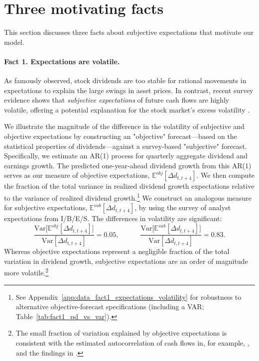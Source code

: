 \section{Three motivating facts}
\label{sec:facts.sec}

This section discusses three facts about subjective expectations that motivate our model. 

\paragraph{Fact 1. Expectations are volatile.}
As \citet{shiller1981stock} famously observed, stock dividends are too stable for rational movements in expectations to explain the large swings in asset prices. In contrast, recent survey evidence shows that \textit{subjective expectations} of future cash flows are highly volatile, offering a potential explanation for the stock market's excess volatility \citep{bordalo2020expectations, de_la_o_subjective_2021}.

We illustrate the magnitude of the difference in the volatility of subjective and objective expectations by constructing an "objective" forecast---based on the statistical properties of dividends---against a survey-based "subjective" forecast. Specifically, we estimate an AR(1) process for quarterly aggregate dividend and earnings growth. The predicted one-year-ahead dividend growth from this AR(1) serves as our measure of objective expectations, $\mathbb{E}^{obj}[\Delta d_{t,t+4}]$. We then compute the fraction of the total variance in realized dividend growth expectations relative to the variance of realized dividend growth.\footnote{
    See Appendix~\ref{app:data_fact1_expectations_volatility} for robustness to alternative objective-forecast specifications (including a VAR; Table~\ref{tab:fact1_pd_vs_var}).
}
 We construct an analogous measure for subjective expectations, $\mathbb{E}^{sub}[\Delta d_{t,t+4}]$, by using the survey of analyst expectations from I/B/E/S. The differences in volatility are significant:
\begin{equation}
    \frac{\mathrm{Var}\!\bigl[\mathbb{E}^{obj}[\Delta d_{t,t+4}]\bigr]}{\mathrm{Var}[\Delta d_{t,t+4}]} = 0.05,
    \qquad\quad
    \frac{\mathrm{Var}\!\bigl[\mathbb{E}^{sub}[\Delta d_{t,t+4}]\bigr]}{\mathrm{Var}[\Delta d_{t,t+4}]} = 0.83.
    \nonumber
\end{equation}
Whereas objective expectations represent a negligible fraction of the total variation in dividend growth, subjective expectations are an order of magnitude more volatile.\footnote{The small fraction of variation explained by objective expectations is consistent with the estimated autocorrelation of cash flows in, for example, \citet{bansal2004risks}, and the findings in \citet{CochraneDog}.}

